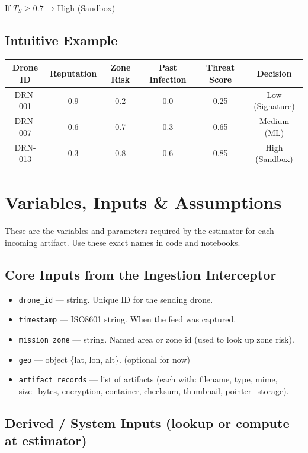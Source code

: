 \documentclass[12pt, a4paper]{report}
\begin{document}
If $T_S \geq 0.7$ → High (Sandbox)

\subsection*{Intuitive Example}

\begin{table}[h!]
\centering
\begin{tabular}{|c|c|c|c|c|c|}
\hline
\textbf{Drone ID} & \textbf{Reputation} & \textbf{Zone Risk} & \textbf{Past Infection} & \textbf{Threat Score} & \textbf{Decision} \\ \hline
DRN-001 & 0.9 & 0.2 & 0.0 & 0.25 & Low (Signature) \\ \hline
DRN-007 & 0.6 & 0.7 & 0.3 & 0.65 & Medium (ML) \\ \hline
DRN-013 & 0.3 & 0.8 & 0.6 & 0.85 & High (Sandbox) \\ \hline
\end{tabular}
\end{table}


\section{Variables, Inputs \& Assumptions}

These are the variables and parameters required by the estimator for each incoming artifact. Use these exact names in code and notebooks.

\subsection*{Core Inputs from the Ingestion Interceptor}

\begin{itemize}
    \item \texttt{drone\_id} — string. Unique ID for the sending drone.
    \item \texttt{timestamp} — ISO8601 string. When the feed was captured.
    \item \texttt{mission\_zone} — string. Named area or zone id (used to look up zone risk).
    \item \texttt{geo} — object \{lat, lon, alt\}. (optional for now)
    \item \texttt{artifact\_records} — list of artifacts (each with: filename, type, mime, size\_bytes, encryption, container, checksum, thumbnail, pointer\_storage).
\end{itemize}

\subsection*{Derived / System Inputs (lookup or compute at estimator)}
\end{document}
